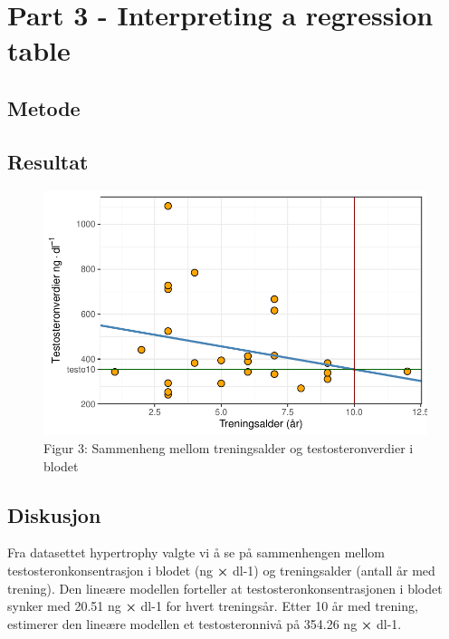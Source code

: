 \documentclass[
  letterpaper,
  DIV=11,
  numbers=noendperiod]{scrreprt}
\begin{document}
\section{Part 3 - Interpreting a regression
table}\label{part-3---interpreting-a-regression-table}

\subsection{Metode}\label{metode-4}

\subsection{Resultat}\label{resultat-3}

\begin{figure}[H]

{\centering \includegraphics{02-regression-models_files/figure-pdf/tolkning av regresjonsmodell-1.pdf}

}

\caption{Figur 3: Sammenheng mellom treningsalder og testosteronverdier
i blodet}

\end{figure}%

\subsection{Diskusjon}\label{diskusjon-2}

Fra datasettet hypertrophy valgte vi å se på sammenhengen mellom
testosteronkonsentrasjon i blodet (ng \textbf{×} dl-1) og treningsalder
(antall år med trening). Den lineære modellen forteller at
testosteronkonsentrasjonen i blodet synker med 20.51 ng \textbf{×} dl-1
for hvert treningsår. Etter 10 år med trening, estimerer den lineære
modellen et testosteronnivå på 354.26 ng \textbf{×} dl-1.
\end{document}
